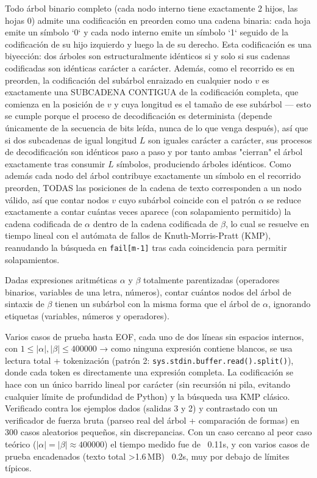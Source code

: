  Todo árbol binario completo (cada nodo interno tiene exactamente 2 hijos, las hojas 0) admite una codificación en preorden como una cadena binaria: cada hoja emite un símbolo `0` y cada nodo interno emite un símbolo `1` seguido de la codificación de su hijo izquierdo y luego la de su derecho. Esta codificación es una biyección: dos árboles son estructuralmente idénticos si y solo si sus cadenas codificadas son idénticas carácter a carácter. Además, como el recorrido es en preorden, la codificación del subárbol enraizado en cualquier nodo $v$ es exactamente una SUBCADENA CONTIGUA de la codificación completa, que comienza en la posición de $v$ y cuya longitud es el tamaño de ese subárbol — esto se cumple porque el proceso de decodificación es determinista (depende únicamente de la secuencia de bits leída, nunca de lo que venga después), así que si dos subcadenas de igual longitud $L$ son iguales carácter a carácter, sus procesos de decodificación son idénticos paso a paso y por tanto ambas "cierran" el árbol exactamente tras consumir $L$ símbolos, produciendo árboles idénticos. Como además cada nodo del árbol contribuye exactamente un símbolo en el recorrido preorden, TODAS las posiciones de la cadena de texto corresponden a un nodo válido, así que contar nodos $v$ cuyo subárbol coincide con el patrón $\alpha$ se reduce exactamente a contar cuántas veces aparece (con solapamiento permitido) la cadena codificada de $\alpha$ dentro de la cadena codificada de $\beta$, lo cual se resuelve en tiempo lineal con el autómata de fallos de Knuth-Morris-Pratt (KMP), reanudando la búsqueda en \texttt{fail[m-1]} tras cada coincidencia para permitir solapamientos.


Dadas expresiones aritméticas $\alpha$ y $\beta$ totalmente parentizadas (operadores binarios, variables de una letra, números), contar cuántos nodos del árbol de sintaxis de $\beta$ tienen un subárbol con la misma forma que el árbol de $\alpha$, ignorando etiquetas (variables, números y operadores).

 Varios casos de prueba hasta EOF, cada uno de dos líneas sin espacios internos, con $1 \le |\alpha|, |\beta| \le 400000$ → como ninguna expresión contiene blancos, se usa lectura total + tokenización (patrón 2: \texttt{sys.stdin.buffer.read().split()}), donde cada token es directamente una expresión completa. La codificación se hace con un único barrido lineal por carácter (sin recursión ni pila, evitando cualquier límite de profundidad de Python) y la búsqueda usa KMP clásico. Verificado contra los ejemplos dados (salidas 3 y 2) y contrastado con un verificador de fuerza bruta (parseo real del árbol + comparación de formas) en 300 casos aleatorios pequeños, sin discrepancias. Con un caso cercano al peor caso teórico ($|\alpha|=|\beta|\approx 400000$) el tiempo medido fue de ~0.11s, y con varios casos de prueba encadenados (texto total >1.6\,MB) ~0.2s, muy por debajo de límites típicos.

